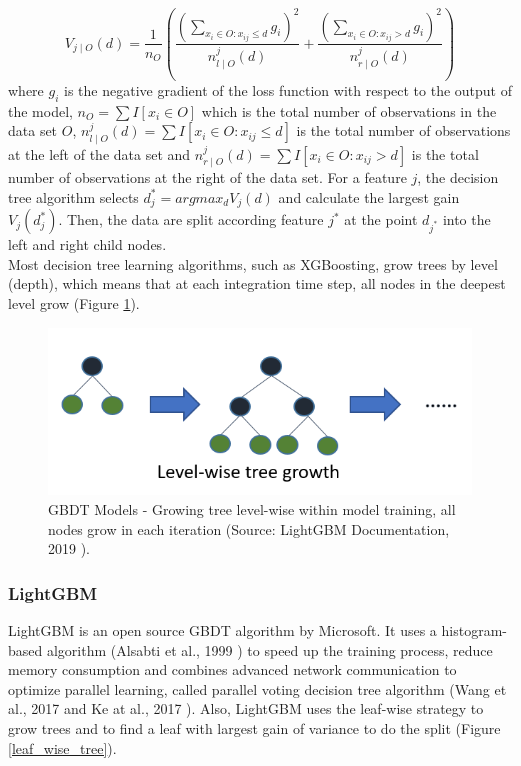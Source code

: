 \documentclass[letterpaper, 10 pt, conference]{ieeeconf}  %
\begin{document}
\begin{equation}
V_{j\mid O}(d)=\frac{1}{n_{O}}\left(\frac{\left(\sum_{x_{i}\in O:x_{ij}\leqslant d} g_{i}\right)^{2} }{n_{l\mid O}^{j}(d)}+\frac{\left(\sum_{x_{i}\in O:x_{ij}>  d} g_{i}\right)^{2}  }{n_{r\mid O}^{j}(d)}\right)
\end{equation}
where
$g_i$ is the negative gradient of the loss function with respect to the output of the model, $n_{O}=\sum I[x_{i} \in O]$ which is the total number of observations in the data set $O$, $n_{l\mid O}^{j}(d)=\sum I[x_{i} \in O:x_{ij}\leqslant d]$ is the total number of observations  at the left of the data set and $n_{r\mid O}^{j}(d)=\sum I[x_{i} \in O:x_{ij} >d]$ is the total number of observations  at the right of the data set. For a feature $j$, the decision tree algorithm selects $d_{j}^{*}=argmax_{d}V_{j}(d)$ and calculate the largest gain $V_{j}(d_{j}^{*})$. Then, the data are split according feature $j^{*}$ at the point $d_{j^{*}}$ into the left and right child nodes.\\

Most decision tree learning algorithms, such as XGBoosting, grow trees by level (depth), which means that at each integration time step, all nodes in the deepest level grow (Figure \ref{level_wise_tree}).

\begin{figure}[thpb]
\centering
\includegraphics[scale=0.5]{Figures/level-wise.png}
\caption{GBDT Models - Growing tree level-wise within model training, all nodes grow in each iteration (Source: LightGBM Documentation, 2019 \cite{LightGBM2019}).}
\label{level_wise_tree}
\end{figure}


\subsubsection{LightGBM}
LightGBM is an open source GBDT algorithm by Microsoft. It uses a histogram-based algorithm (Alsabti et al., 1999 \cite{Alsabti1999}) to speed up the training process, reduce memory consumption and combines advanced network communication to optimize parallel learning, called parallel voting decision tree algorithm (Wang et al., 2017 \cite{Wang2017} and Ke at al., 2017 \cite{LGBM}). Also,  LightGBM uses the leaf-wise strategy to grow trees and to find a leaf with largest gain of variance to do the split (Figure \ref{leaf_wise_tree}).\\
\end{document}
